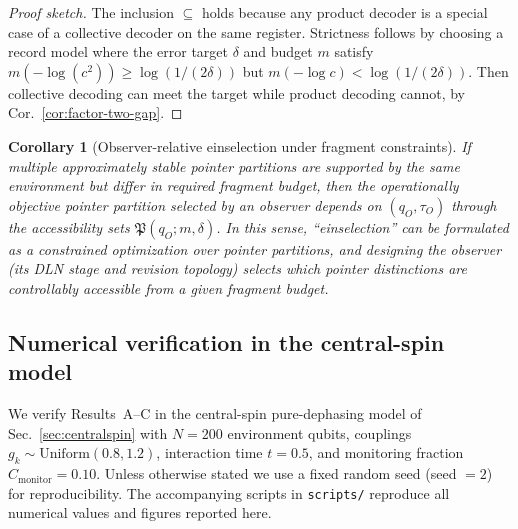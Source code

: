\documentclass[11pt]{article}
\newcommand{\1}{\mathbf{1}}
\theoremstyle{definition}
\theoremstyle{plain}
\newtheorem{corollary}{Corollary}
\begin{document}
\begin{proof}[Proof sketch]
The inclusion $\subseteq$ holds because any product decoder is a special case of a collective decoder on the same register.
Strictness follows by choosing a record model where the error target $\delta$ and budget $m$ satisfy
$m(-\log(c^2))\ge \log(1/(2\delta))$ but $m(-\log c)<\log(1/(2\delta))$.
Then collective decoding can meet the target while product decoding cannot, by Cor.~\ref{cor:factor-two-gap}.
\end{proof}

\begin{corollary}[Observer-relative einselection under fragment constraints]
\label{cor:observer-relative-einselection}
If multiple approximately stable pointer partitions are supported by the same environment but differ in required fragment budget, then the \emph{operationally objective} pointer partition selected by an observer depends on $(q_O,\tau_O)$ through the accessibility sets $\mathfrak{P}(q_O;m,\delta)$.
In this sense, ``einselection'' can be formulated as a constrained optimization over pointer partitions, and designing the observer (its DLN stage and revision topology) selects which pointer distinctions are controllably accessible from a given fragment budget.
\end{corollary}


\subsection{Numerical verification in the central-spin model}
\label{sec:numerical-verification}

We verify Results~A--C in the central-spin pure-dephasing model of Sec.~\ref{sec:centralspin} with $N=200$ environment qubits, couplings $g_k\sim\mathrm{Uniform}(0.8,1.2)$, interaction time $t=0.5$, and monitoring fraction $C_{\mathrm{monitor}}=0.10$.
Unless otherwise stated we use a fixed random seed (seed $=2$) for reproducibility.
The accompanying scripts in \texttt{scripts/} reproduce all numerical values and figures reported here.
\end{document}

